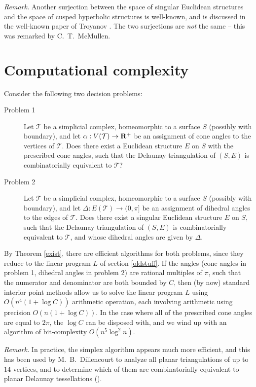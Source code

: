 \documentclass{acmart}
\begin{document}
\medskip\noindent
\textit{Remark.} Another surjection between the space of singular
Euclidean structures and the space of cusped hyperbolic structures is
well-known, and is discussed in the well-known paper of Troyanov
\cite{troy}. The two surjections are \emph{not} the same -- this was
remarked by C.~T.~McMullen.

\section{Computational complexity}
\label{complexsec}

Consider the following two decision problems:

\begin{description}
\item[Problem 1]
Let $\mathcal{T}$ be a simplicial complex, homeomorphic to a surface $S$
(possibly with boundary), and let $\alpha: V(\mathcal{T}) \rightarrow
{\bf R}^+$ be an assignment of cone angles to the vertices of
$\mathcal{T}$. Does there exist a Euclidean structure $E$ on $S$ with
the prescribed cone angles, such that the Delaunay triangulation of $(S,
E)$ is combinatorially equivalent to $\mathcal{T}$?

\item[Problem 2]
Let $\mathcal{T}$ be a simplicial complex, homeomorphic to a surface
$S$ (possibly with boundary), and let $\Delta: E(\mathcal{T})
\rightarrow (0, \pi]$ be an assignment of dihedral angles to the edges
of $\mathcal{T}$. Does there exist a singular Euclidean structure $E$
on $S$, such that the Delaunay triangulation of $(S, E)$ is
combinatorially equivalent to $\mathcal{T}$, and whose dihedral angles
are given by $\Delta$.
\end{description}

By Theorem \ref{exist}, there are efficient algorithms for both
problems, since they reduce to the linear program $L$ of section
\ref{oldstuff}. If the angles (cone angles in problem 1, dihedral
angles in problem 2) are rational multiples of $\pi$, such that the
numerator and denominator are both bounded by $C$, then (by now)
standard interior point methods allow us to solve the linear program
$L$ using $O(n^4 (1+ \log C))$ arithmetic operation, each involving
arithmetic using precision $O(n (1+\log C))$. In the case where all
of the prescribed cone angles are equal to $2\pi$, the $\log C$ can be
disposed with, and we wind up with an algorithm of bit-complexity
$O(n^5 \log^2 n).$ 

\medskip\noindent
\textit{Remark.} In practice, the simplex algorithm appears much more
efficient, and this has been used by M.~B.~Dillencourt to 
analyze all planar triangulations of up to $14$ vertices, and to
determine which of them are combinatorially equivalent to planar
Delaunay tessellations (\cite{Dill1,Dillp}).
\end{document}
